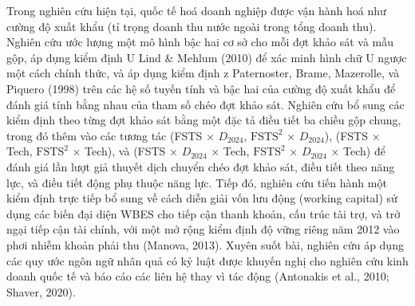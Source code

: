 \documentclass[12pt,a4paper]{article}
\begin{document}
Trong nghiên cứu hiện tại, quốc tế hoá doanh nghiệp được vận hành hoá
như cường độ xuất khẩu (tỉ trọng doanh thu nước ngoài trong tổng doanh
thu). Nghiên cứu ước lượng một mô hình bậc hai cơ sở cho mỗi đợt khảo
sát và mẫu gộp, áp dụng kiểm định U Lind \& Mehlum (2010) để xác minh
hình chữ U ngược một cách chính thức, và áp dụng kiểm định z
Paternoster, Brame, Mazerolle, và Piquero (1998) trên các hệ số tuyến
tính và bậc hai của cường độ xuất khẩu để đánh giá tính bằng nhau của
tham số chéo đợt khảo sát. Nghiên cứu bổ sung các kiểm định theo từng
đợt khảo sát bằng một đặc tả điều tiết ba chiều gộp chung, trong đó thêm
vào các tương tác (FSTS × \(D_{2024}\), \(\mathrm{FSTS}^2\) ×
\(D_{2024}\)), (FSTS × Tech, \(\mathrm{FSTS}^2\) × Tech), và (FSTS ×
\(D_{2024}\) × Tech, \(\mathrm{FSTS}^2\) × \(D_{2024}\) × Tech) để đánh
giá lần lượt giả thuyết dịch chuyển chéo đợt khảo sát, điều tiết theo
năng lực, và điều tiết động phụ thuộc năng lực. Tiếp đó, nghiên cứu tiến
hành một kiểm định trực tiếp bổ sung về cách diễn giải vốn lưu động
(working capital) sử dụng các biến đại diện WBES cho tiếp cận thanh
khoản, cấu trúc tài trợ, và trở ngại tiếp cận tài chính, với một mở rộng
kiểm định độ vững riêng năm 2012 vào phơi nhiễm khoản phải thu (Manova,
2013). Xuyên suốt bài, nghiên cứu áp dụng các quy ước ngôn ngữ nhân quả
có kỷ luật được khuyến nghị cho nghiên cứu kinh doanh quốc tế và báo cáo
các liên hệ thay vì tác động (Antonakis et al., 2010; Shaver, 2020).
\end{document}
